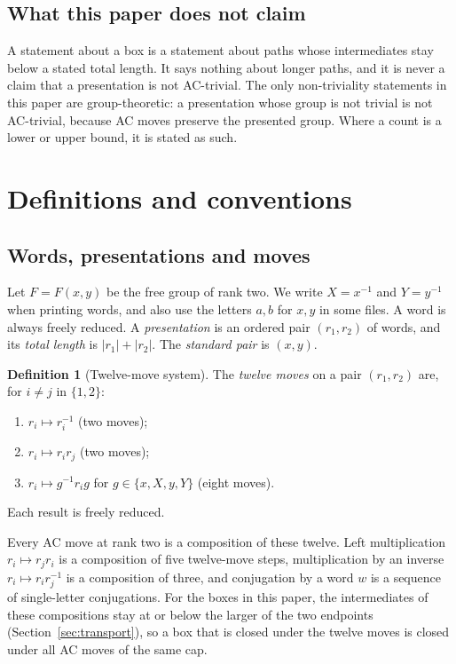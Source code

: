 \documentclass[11pt,a4paper]{article}
\theoremstyle{definition}
\newtheorem{definition}[theorem]{Definition}
\newcommand{\Fr}{F}
\newcommand{\inv}[1]{#1^{-1}}
\begin{document}
\subsection{What this paper does not claim}

A statement about a box is a statement about paths whose intermediates stay below a stated total length. It says nothing about longer paths, and it is never a claim that a presentation is not AC-trivial. The only non-triviality statements in this paper are group-theoretic: a presentation whose group is not trivial is not AC-trivial, because AC moves preserve the presented group. Where a count is a lower or upper bound, it is stated as such.

\section{Definitions and conventions}\label{sec:defs}

\subsection{Words, presentations and moves}

Let $\Fr=\Fr(x,y)$ be the free group of rank two. We write $X=\inv{x}$ and $Y=\inv{y}$ when printing words, and also use the letters $a,b$ for $x,y$ in some files. A word is always freely reduced. A \emph{presentation} is an ordered pair $(r_1,r_2)$ of words, and its \emph{total length} is $|r_1|+|r_2|$. The \emph{standard pair} is $(x,y)$.

\begin{definition}[Twelve-move system]
The \emph{twelve moves} on a pair $(r_1,r_2)$ are, for $i\ne j$ in $\{1,2\}$:
\begin{enumerate}
\item $r_i\mapsto \inv{r_i}$ (two moves);
\item $r_i\mapsto r_ir_j$ (two moves);
\item $r_i\mapsto \inv{g}r_ig$ for $g\in\{x,X,y,Y\}$ (eight moves).
\end{enumerate}
Each result is freely reduced.
\end{definition}

Every AC move at rank two is a composition of these twelve. Left multiplication $r_i\mapsto r_jr_i$ is a composition of five twelve-move steps, multiplication by an inverse $r_i\mapsto r_i\inv{r_j}$ is a composition of three, and conjugation by a word $w$ is a sequence of single-letter conjugations. For the boxes in this paper, the intermediates of these compositions stay at or below the larger of the two endpoints (Section~\ref{sec:transport}), so a box that is closed under the twelve moves is closed under all AC moves of the same cap.
\end{document}
